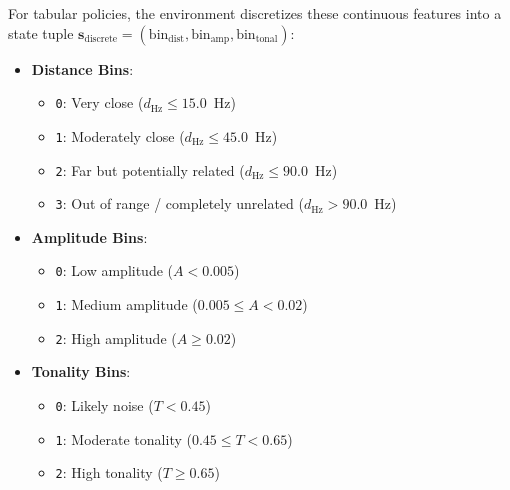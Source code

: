 \documentclass[12pt,a4paper]{article}
\begin{document}
For tabular policies, the environment discretizes these continuous features into a state tuple $\mathbf{s}_{\text{discrete}} = (\text{bin}_{\text{dist}}, \text{bin}_{\text{amp}}, \text{bin}_{\text{tonal}})$:
\begin{itemize}
    \item \textbf{Distance Bins}:
    \begin{itemize}
        \item \texttt{0}: Very close ($d_{\text{Hz}} \le 15.0$~Hz)
        \item \texttt{1}: Moderately close ($d_{\text{Hz}} \le 45.0$~Hz)
        \item \texttt{2}: Far but potentially related ($d_{\text{Hz}} \le 90.0$~Hz)
        \item \texttt{3}: Out of range / completely unrelated ($d_{\text{Hz}} > 90.0$~Hz)
    \end{itemize}
    \item \textbf{Amplitude Bins}:
    \begin{itemize}
        \item \texttt{0}: Low amplitude ($A < 0.005$)
        \item \texttt{1}: Medium amplitude ($0.005 \le A < 0.02$)
        \item \texttt{2}: High amplitude ($A \ge 0.02$)
    \end{itemize}
    \item \textbf{Tonality Bins}:
    \begin{itemize}
        \item \texttt{0}: Likely noise ($T < 0.45$)
        \item \texttt{1}: Moderate tonality ($0.45 \le T < 0.65$)
        \item \texttt{2}: High tonality ($T \ge 0.65$)
    \end{itemize}
\end{itemize}
\end{document}
